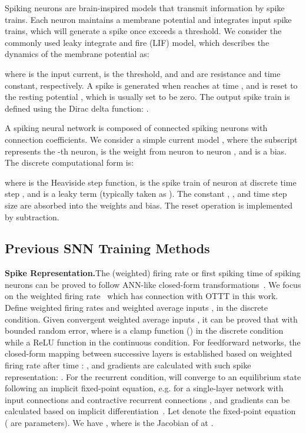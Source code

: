 \documentclass{article}
\begin{document}
Spiking neurons are brain-inspired models that transmit information by spike trains. Each neuron maintains a membrane potential  and integrates input spike trains, which will generate a spike once  exceeds a threshold. We consider the commonly used leaky integrate and fire (LIF) model, which describes the dynamics of the membrane potential as:
\vspace{-1mm}

where  is the input current,  is the threshold, and  and  are resistance and time constant, respectively. 
A spike is generated when  reaches  at time , and  is reset to the resting potential , which is usually set to be zero. The output spike train is defined using the Dirac delta function: . 

A spiking neural network is composed of connected spiking neurons with connection coefficients. We consider a simple current model , where the subscript  represents the -th neuron,  is the weight from neuron  to neuron , and  is a bias. The discrete computational form is: 
\vspace{-2mm}

where  is the Heaviside step function,   is the spike train of neuron  at discrete time step , and  is a leaky term (typically taken as ). The constant , , and time step size are absorbed into the weights and bias. The reset operation is implemented by subtraction. 

\subsection{Previous SNN Training Methods}\label{previous training methods}
\vspace{-2mm}

\textbf{Spike Representation.}\quad The (weighted) firing rate or first spiking time of spiking neurons can be proved to follow ANN-like closed-form transformations~\cite{deng2021optimal,zhou2021temporal,wu2021tandem,xiao2021training,meng2022training}. We focus on the weighted firing rate~\cite{xiao2021training,meng2022training} which has connection with OTTT in this work. Define weighted firing rates and weighted average inputs ,  in the discrete condition. Given convergent weighted average inputs , it can be proved that  with bounded random error, where  is a clamp function () in the discrete condition while a ReLU function in the continuous condition. 
For feedforward networks, the closed-form mapping between successive layers is established based on weighted firing rate after time : , and gradients are calculated with such spike representation: . For the recurrent condition,  will converge to an equilibrium state following an implicit fixed-point equation, e.g.  for a single-layer network with input connections  and contractive recurrent connections , and gradients can be calculated based on implicit differentiation~\cite{xiao2021training}. Let  denote the fixed-point equation ( are parameters). We have , where  is the Jacobian of  at .
\end{document}
